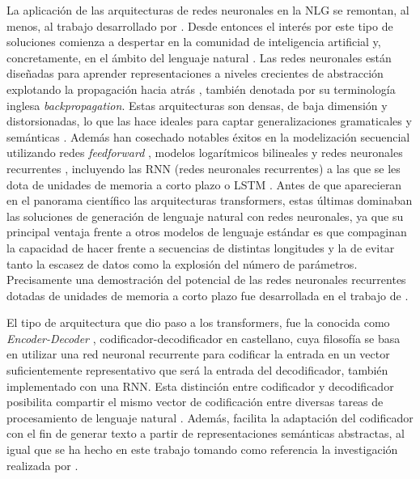 La aplicación de las arquitecturas de redes neuronales en la NLG se remontan, al menos, al trabajo desarrollado por \cite{kukich1987phrases}. Desde entonces el interés por este tipo de soluciones comienza a despertar en la comunidad de inteligencia artificial y, concretamente, en el ámbito del lenguaje natural \citep{elman1990finding, elman1993learning, chang2006becoming}. Las redes neuronales están diseñadas para aprender representaciones a niveles crecientes de abstracción explotando la propagación hacia atrás \citep{lecun2015deep}, también denotada por su terminología inglesa \textit{backpropagation}. Estas arquitecturas son densas, de baja dimensión y distorsionadas, lo que las hace ideales para captar generalizaciones gramaticales y semánticas \citep{mikolov2013distributed, luong2013better, pennington2014glove}. Además han cosechado notables éxitos en la modelización secuencial utilizando redes \textit{feedforward} \citep{bengio2003neural, schwenk2005training}, modelos logarítmicos bilineales \citep{mnih2007three} y redes neuronales recurrentes \citep{mikolov2010recurrent}, incluyendo las RNN (redes neuronales recurrentes) a las que se les dota de unidades de memoria a corto plazo o LSTM \citep{hochreiter1997long}. Antes de que aparecieran en el panorama científico las arquitecturas transformers, estas últimas dominaban las soluciones de generación de lenguaje natural con redes neuronales, ya que su principal ventaja frente a otros modelos de lenguaje estándar es que compaginan la capacidad de hacer frente a secuencias de distintas longitudes y la de evitar tanto la escasez de datos como la explosión del número de parámetros. Precisamente una demostración del potencial de las redes neuronales recurrentes dotadas de unidades de memoria a corto plazo fue desarrollada en el trabajo de \cite{sutskever2011generating}.

El tipo de arquitectura que dio paso a los transformers, fue la conocida como \textit{Encoder-Decoder} \citep{sutskever2014sequence}, codificador-decodificador en castellano, cuya filosofía se basa en utilizar una red neuronal recurrente para codificar la entrada en un vector suficientemente representativo que será la entrada del decodificador, también implementado con una RNN. Esta distinción entre codificador y decodificador posibilita compartir el mismo vector de codificación entre diversas tareas de procesamiento de lenguaje natural \citep{dong2015multi, luong2015multi}. Además, facilita la adaptación del codificador con el fin de generar texto a partir de representaciones semánticas abstractas, al igual que se ha hecho en este trabajo tomando como referencia la investigación realizada por \cite{ferreira2017linguistic}.

